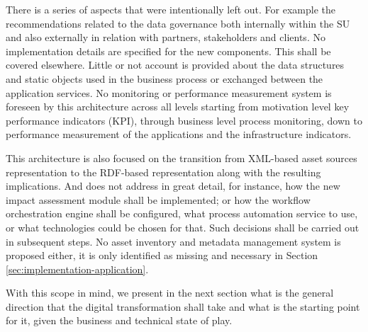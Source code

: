 	There is a series of aspects that were intentionally left out. For example the recommendations related to the data governance both internally within the SU and also externally in relation with partners, stakeholders and clients. No implementation details are specified for the new components. This shall be covered elsewhere. Little or not account is provided about the data structures and static objects used in the business process or exchanged between the application services. No monitoring or performance measurement system is foreseen by this architecture across all levels starting from motivation level key performance indicators (KPI), through business level process monitoring, down to performance measurement of the applications and the infrastructure indicators. 
	
	This architecture is also focused on the transition from XML-based asset sources representation to the RDF-based representation along with the resulting implications. And does not address in great detail, for instance, how the new impact assessment module shall be implemented; or how the workflow orchestration engine shall be configured, what process automation service to use, or what technologies could be chosen for that. Such decisions shall be carried out in subsequent steps.	No asset inventory and metadata management system is proposed either, it is only identified as missing and necessary in Section \ref{sec:implementation-application}. 
	
	With this scope in mind, we present in the next section what is the general direction that the digital transformation shall take and what is the starting point for it, given the business and technical state of play. 